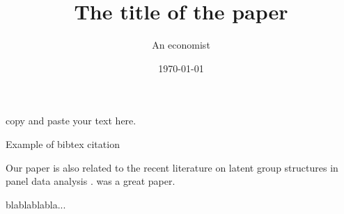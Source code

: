 \documentclass[11pt,english]{article}
\title{The title of the paper}
\author{An economist}
\date{\today}
\begin{document}
\maketitle


copy and paste your text here.

Example of bibtex citation

Our paper is also related to the recent literature on latent group
structures in panel data analysis \citep{su2016identifying}.
\citet{shi2016econometric} was a great paper.

blablablabla...



\end{document}
